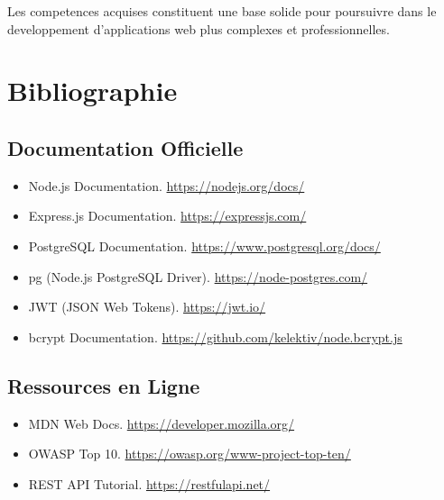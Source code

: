 \documentclass[a4paper,12pt]{book}
\begin{document}
Les competences acquises constituent une base solide pour poursuivre dans le developpement d'applications web plus complexes et professionnelles.

\chapter{Bibliographie}

\section*{Documentation Officielle}

\begin{itemize}
    \item Node.js Documentation. \url{https://nodejs.org/docs/}
    \item Express.js Documentation. \url{https://expressjs.com/}
    \item PostgreSQL Documentation. \url{https://www.postgresql.org/docs/}
    \item pg (Node.js PostgreSQL Driver). \url{https://node-postgres.com/}
    \item JWT (JSON Web Tokens). \url{https://jwt.io/}
    \item bcrypt Documentation. \url{https://github.com/kelektiv/node.bcrypt.js}
\end{itemize}

\section*{Ressources en Ligne}

\begin{itemize}
    \item MDN Web Docs. \url{https://developer.mozilla.org/}
    \item OWASP Top 10. \url{https://owasp.org/www-project-top-ten/}
    \item REST API Tutorial. \url{https://restfulapi.net/}
\end{itemize}



\end{document}
